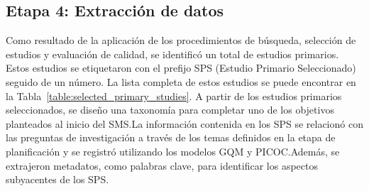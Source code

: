 \subsection{Etapa 4: Extracción de datos}\label{sec:extraccion-de-datos}

Como resultado de la aplicación de los procedimientos de búsqueda, selección de estudios y evaluación de calidad, se identificó un 
total de \totalEtapaDos{} estudios primarios. Estos estudios se etiquetaron con el prefijo SPS (Estudio Primario Seleccionado) 
seguido de un número. La lista completa de estos estudios se puede encontrar en la Tabla~\ref{table:selected_primary_studies}. A 
partir de los \totalEtapaDos{} estudios primarios seleccionados, se diseño una taxonomía para completar uno de los objetivos 
planteados al inicio del SMS.\@ La información contenida en los SPS se relacionó con las preguntas de investigación a través de 
los temas definidos en la etapa de planificación y se registró utilizando los modelos GQM y PICOC.\@ Además, se extrajeron 
metadatos, como palabras clave, para identificar los aspectos subyacentes de los SPS.\@

